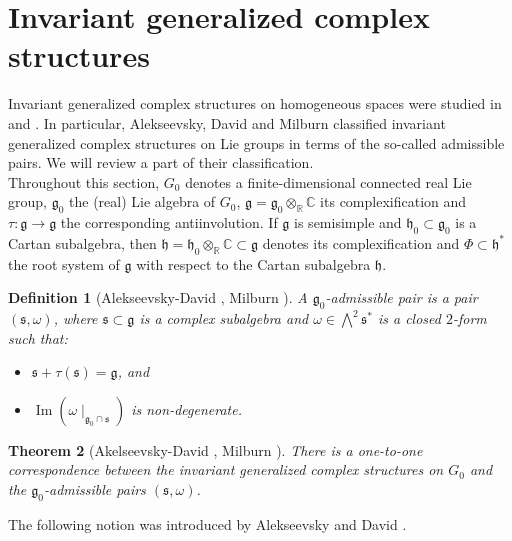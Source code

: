 \documentclass[10pt]{article}
\newtheorem{theorem}{Theorem}[section]
\newtheorem{definition}[theorem]{Definition}
\begin{document}
\section{Invariant generalized complex structures}

Invariant generalized complex structures on homogeneous spaces were studied in \cite{Milburn} and \cite{Liana}. In particular, Alekseevsky, David and Milburn classified invariant generalized complex structures on Lie groups in terms of the so-called admissible pairs. We will review a part of their classification.\\

Throughout this section, $G_0$ denotes a finite-dimensional connected real Lie group, ${\mathfrak{g}}_0$ the (real) Lie algebra of $G_0$, $\mathfrak{g}=\mathfrak{g}_0 \otimes_{\mathbb R} \mathbb C$ its complexification and $\tau \colon \mathfrak{g} \to \mathfrak{g}$ the corresponding antiinvolution. If $\mathfrak{g}$ is semisimple and ${\mathfrak{h}}_0\subset {\mathfrak{g}}_0$ is a Cartan subalgebra, then $\mathfrak{h}=\mathfrak{h}_0 \otimes_{\mathbb R} \mathbb C\subset \mathfrak{g}$ denotes its complexification and $\Phi \subset {\mathfrak{h}}^{*}$ the root system of $\mathfrak{g}$ with respect to the Cartan subalgebra $\mathfrak{h}$.

\begin{definition}[Alekseevsky-David \cite{Liana}, Milburn \cite{Milburn}]
A \textit{{$\mathfrak{g}_0$}-admissible pair} is a pair $(\mathfrak{s},\omega )$, where $\mathfrak{s}\subset \mathfrak{g}$ is a complex subalgebra and $\omega \in \bigwedge ^2 {\mathfrak{s}}^{*}$ is a closed $2$-form such that:
\begin{itemize}
\item $\mathfrak{s}+\tau (\mathfrak{s})=\mathfrak{g}$, and
\item $\operatorname{Im}(\omega \mid _{{\mathfrak{g}_0}\cap \mathfrak{s}})$ is non-degenerate.
\end{itemize}
\end{definition}

\begin{theorem}[Akelseevsky-David \cite{Liana}, Milburn \cite{Milburn}]\label{theorem:1}
There is a one-to-one correspondence between the invariant generalized complex structures on $G_0$ and the ${\mathfrak{g}_0}$-admissible pairs $(\mathfrak{s},\omega )$.
\end{theorem}

The following notion was introduced by Alekseevsky and David \cite{Liana}. 
\end{document}

